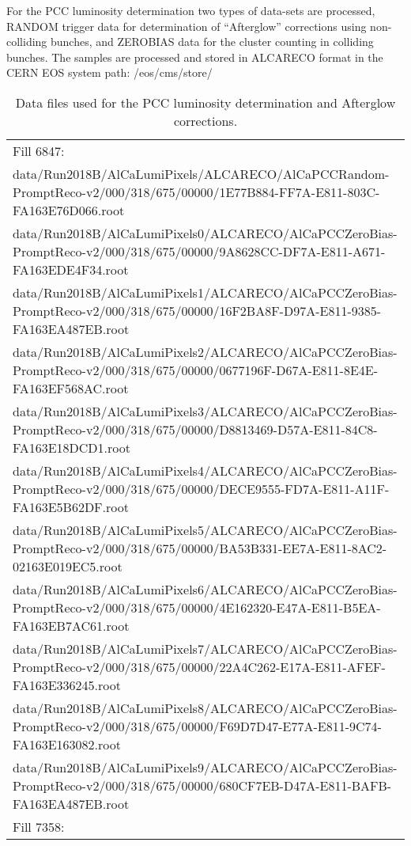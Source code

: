 
For the PCC luminosity determination two types of data-sets are processed, RANDOM trigger data for determination of ``Afterglow'' corrections using non-colliding bunches, and ZEROBIAS data for the cluster counting in colliding bunches.
The samples are processed and stored in ALCARECO format in the CERN EOS system path: /eos/cms/store/


\begin{table}[h]
  \caption{Data files used for the PCC luminosity determination and Afterglow corrections.}
  \tiny
  \begin{tabular}{l}
    \hline\hline
    Fill 6847:\\
data/Run2018B/AlCaLumiPixels/ALCARECO/AlCaPCCRandom-PromptReco-v2/000/318/675/00000/1E77B884-FF7A-E811-803C-FA163E76D066.root \\
data/Run2018B/AlCaLumiPixels0/ALCARECO/AlCaPCCZeroBias-PromptReco-v2/000/318/675/00000/9A8628CC-DF7A-E811-A671-FA163EDE4F34.root \\
data/Run2018B/AlCaLumiPixels1/ALCARECO/AlCaPCCZeroBias-PromptReco-v2/000/318/675/00000/16F2BA8F-D97A-E811-9385-FA163EA487EB.root \\
data/Run2018B/AlCaLumiPixels2/ALCARECO/AlCaPCCZeroBias-PromptReco-v2/000/318/675/00000/0677196F-D67A-E811-8E4E-FA163EF568AC.root \\
data/Run2018B/AlCaLumiPixels3/ALCARECO/AlCaPCCZeroBias-PromptReco-v2/000/318/675/00000/D8813469-D57A-E811-84C8-FA163E18DCD1.root \\
data/Run2018B/AlCaLumiPixels4/ALCARECO/AlCaPCCZeroBias-PromptReco-v2/000/318/675/00000/DECE9555-FD7A-E811-A11F-FA163E5B62DF.root \\
data/Run2018B/AlCaLumiPixels5/ALCARECO/AlCaPCCZeroBias-PromptReco-v2/000/318/675/00000/BA53B331-EE7A-E811-8AC2-02163E019EC5.root \\
data/Run2018B/AlCaLumiPixels6/ALCARECO/AlCaPCCZeroBias-PromptReco-v2/000/318/675/00000/4E162320-E47A-E811-B5EA-FA163EB7AC61.root \\
data/Run2018B/AlCaLumiPixels7/ALCARECO/AlCaPCCZeroBias-PromptReco-v2/000/318/675/00000/22A4C262-E17A-E811-AFEF-FA163E336245.root \\
data/Run2018B/AlCaLumiPixels8/ALCARECO/AlCaPCCZeroBias-PromptReco-v2/000/318/675/00000/F69D7D47-E77A-E811-9C74-FA163E163082.root \\
data/Run2018B/AlCaLumiPixels9/ALCARECO/AlCaPCCZeroBias-PromptReco-v2/000/318/675/00000/680CF7EB-D47A-E811-BAFB-FA163EA487EB.root \\
\hline
    Fill 7358:\\

\end{tabular}
\end{table}
